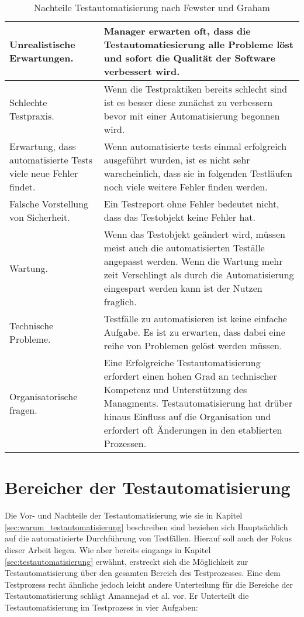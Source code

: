 \begin{table}
\begin{tabular}{p{}|p{}}
Unrealistische Erwartungen.
& Manager erwarten oft, dass die Testautomatiesierung alle Probleme löst und sofort die Qualität der Software verbessert wird. \\
\hline 
Schlechte Testpraxis.
& Wenn die Testpraktiken bereits schlecht sind ist es besser diese zunächst zu verbessern bevor mit einer Automatisierung begonnen wird. \\ 
\hline 
Erwartung, dass automatisierte Tests viele neue Fehler findet. & 
Wenn automatisierte tests einmal erfolgreich ausgeführt wurden, ist es nicht sehr warscheinlich, dass sie in folgenden Testläufen noch viele weitere Fehler finden werden.\\ 
\hline 
Falsche Vorstellung von Sicherheit. & Ein Testreport ohne Fehler bedeutet nicht, dass das Testobjekt keine Fehler hat.  \\ 
\hline 
Wartung. & Wenn das Testobjekt geändert wird, müssen meist auch die automatisierten Teställe angepasst werden. Wenn die Wartung mehr zeit Verschlingt als durch die Automatisierung eingespart werden kann ist der Nutzen fraglich.  \\ 
\hline 
Technische Probleme. & Testfälle zu automatisieren ist keine einfache Aufgabe. Es ist zu erwarten, dass dabei eine reihe von Problemen gelöst werden müssen. \\ 
\hline 
Organisatorische fragen. & Eine Erfolgreiche Testautomatisierung erfordert einen hohen Grad an technischer Kompetenz und Unterstützung des Managments. Testautomatisierung hat drüber hinaus Einfluss auf die Organisation und erfordert oft Änderungen in den etablierten Prozessen. \\ 
\end{tabular} 
\caption{Nachteile Testautomatisierung nach Fewster und Graham \cite{fewster_software_1999}}
\label{tbl:nachteile_testautomatisierung}
\end{table}





\section{Bereicher der Testautomatisierung}
\label{sec:bereicher_der_estautomatisierung}

Die Vor- und Nachteile der Testautomatisierung wie sie in Kapitel \ref{sec:warum_testautomatisierung} beschreiben sind beziehen sich Hauptsächlich auf die automatisierte Durchführung von Testfällen. Hierauf soll auch der Fokus dieser Arbeit liegen. Wie aber bereits eingangs in Kapitel \ref{sec:testautomatisierung} erwähnt, erstreckt sich die Möglichkeit zur Testautomatisierung über den gesamten Bereich des Testprozesses.
Eine dem Testprozess recht ähnliche jedoch leicht andere Unterteilung für die Bereiche der Testautomatisierung schlägt Amannejad et al. \cite{amannejad_search-based_2014} vor.
Er Unterteilt die Testautomatisierung im Testprozess in vier Aufgaben:

